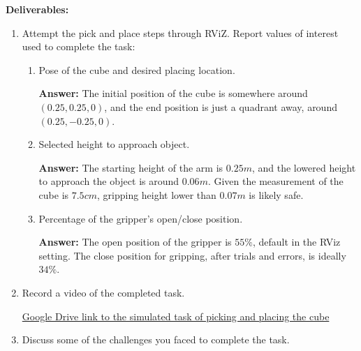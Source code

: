 \documentclass[12pt]{article}
\begin{document}
\textbf{Deliverables:}

\begin{enumerate}

    \item Attempt the pick and place steps through RViZ. Report values of interest used to complete the task:
    
    \begin{enumerate}

        \item Pose of the cube and desired placing location.
        
        \textbf{Answer: }The initial position of the cube is somewhere around $(0.25, 0.25, 0)$, and the end position is just a quadrant away, around $(0.25, -0.25, 0)$.

        \item Selected height to approach object.
        
        \textbf{Answer: }The starting height of the arm is $0.25m$, and the lowered height to approach the object is around $0.06m$. Given the measurement of the cube is $7.5cm$, gripping height lower than $0.07m$ is likely safe.
        
        \item Percentage of the gripper’s open/close position.
        
        \textbf{Answer: }The open position of the gripper is $55\%$, default in the RViz setting. The close position for gripping, after trials and errors, is ideally $34\%$.

    \end{enumerate}

    \item Record a video of the completed task.
    
    \href{https://drive.google.com/file/d/1fpz9qItjWTIsZXeMqtLjGcoJgKeZQ377/view?usp=share_link}{Google Drive link to the simulated task of picking and placing the cube}

    \item Discuss some of the challenges you faced to complete the task.
    

\end{enumerate}
\end{document}
